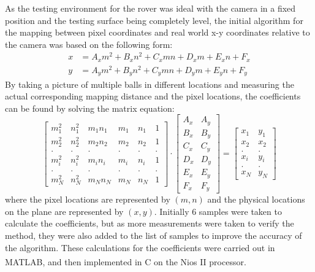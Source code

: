 \documentclass[a4paper]{article}
\begin{document}
As the testing environment for the rover was ideal with the camera in a fixed 
position and the testing surface being completely level, the initial algorithm 
for the mapping between pixel coordinates and real world x-y coordinates relative
to the camera was based on the following form: \begin{align*}
    x & = A_x m^2 + B_x n^2 + C_x mn + D_x m + E_x n + F_x \\
    y & = A_y m^2 + B_y n^2 + C_y mn + D_y m + E_y n + F_y  
\end{align*} By taking a picture of multiple balls in different locations and 
measuring the actual corresponding mapping distance and the pixel locations, the
coefficients can be found by solving the matrix equation: $$
    \begin{bmatrix}
        m^2_1 & n^2_1 & m_1n_1 & m_1 & n_1 & 1 \\
        m^2_2 & n^2_2 & m_2n_2 & m_2 & n_2 & 1 \\
        .     & .     &    .   &  .  & .   & . \\
        m^2_i & n^2_i & m_in_i & m_i & n_i & 1 \\  
        .     & .     &    .   &  .  & .   & . \\
        m^2_N & n^2_N & m_Nn_N & m_N & n_N & 1  
    \end{bmatrix}
    \cdot
    \begin{bmatrix}
        A_x & A_y \\
        B_x & B_y \\
        C_x & C_y \\
        D_x & D_y \\
        E_x & E_y \\
        F_x & F_y
    \end{bmatrix}
    =
    \begin{bmatrix}
        x_1 & y_1 \\
        x_2 & x_2 \\
        . & . \\
        x_i & y_i \\
        . & . \\
        x_N & y_N
    \end{bmatrix}
$$ where the pixel locations are represented by \((m,n)\) and the physical locations on
the plane are represented by \((x,y)\). Initially 6 samples were taken to calculate 
the coefficients, but as more measurements were taken to verify the method, they
were also added to the list of samples to improve the accuracy of the algorithm.
These calculations for the coefficients were carried out in MATLAB, and then 
implemented in C on the Nios\textsuperscript{\textregistered} II processor. 
\end{document}
